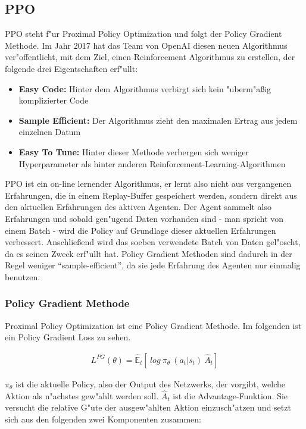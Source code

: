 \documentclass[12pt,a4paper]{article}
\begin{document}
\subsection{PPO}
PPO steht f"ur Proximal Policy Optimization und folgt der Policy Gradient Methode. Im Jahr 2017 hat das Team von OpenAI diesen neuen Algorithmus
ver"offentlicht, mit dem Ziel, einen Reinforcement Algorithmus zu erstellen, der folgende drei Eigentschaften erf"ullt\cite{openai:ppo}:
\begin{itemize}
	\item \textbf{Easy Code:} Hinter dem Algorithmus verbirgt sich kein "uberm"aßig komplizierter Code
	\item \textbf{Sample Efficient:} Der Algorithmus zieht den maximalen Ertrag aus jedem einzelnen Datum
	\item \textbf{Easy To Tune:} Hinter dieser Methode verbergen sich weniger Hyperparameter als hinter anderen Reinforcement-Learning-Algorithmen
\end{itemize}
PPO ist ein on-line lernender Algorithmus, er lernt also nicht aus vergangenen Erfahrungen, die in einem Replay-Buffer gespeichert werden, sondern direkt aus den aktuellen Erfahrungen des aktiven Agenten.
Der Agent sammelt also Erfahrungen und sobald gen"ugend Daten vorhanden sind - man spricht von einem Batch - wird die Policy auf Grundlage dieser aktuellen Erfahrungen verbessert. Anschließend wird das soeben verwendete Batch von Daten gel"oscht, da es seinen Zweck erf"ullt hat.
\newline
Policy Gradient Methoden sind dadurch in der Regel weniger ``sample-efficient'', da sie jede Erfahrung des Agenten nur einmalig benutzen.

\subsubsection{Policy Gradient Methode}
Proximal Policy Optimization ist eine Policy Gradient Methode.
Im folgenden ist ein Policy Gradient Loss zu sehen.

\begin{eqnarray}
L^{PG}(\theta) = \hat{\mathbb{E}}_{t}[\:log\: \pi_{\theta}\:(a_{t}|s_{t})\:\hat{A}_{t}]
\end{eqnarray}

$\pi_{\theta}$ ist die aktuelle Policy, also der Output des Netzwerks, der vorgibt, welche Aktion als n"achstes gew"ahlt werden soll.
$\hat{A}_{t}$ ist die Advantage-Funktion. Sie versucht die relative G"ute der ausgew"ahlten Aktion einzusch"atzen und setzt sich aus den folgenden zwei Komponenten zusammen:
\end{document}
